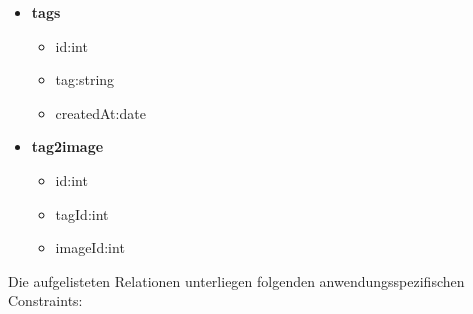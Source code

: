 \documentclass[12pt, oneside, a4paper]{article}		%
\begin{document}
\begin{itemize}
\begin{itemize}
	\end{itemize}
	\item \textbf{tags}
	\begin{itemize}
		\item id:int
		\item tag:string
		\item createdAt:date
	\end{itemize}
	\item \textbf{tag2image}
	\begin{itemize}
		\item id:int
		\item tagId:int
		\item imageId:int
	\end{itemize}
\end{itemize}

Die aufgelisteten Relationen unterliegen folgenden anwendungsspezifischen Constraints:
\end{document}
